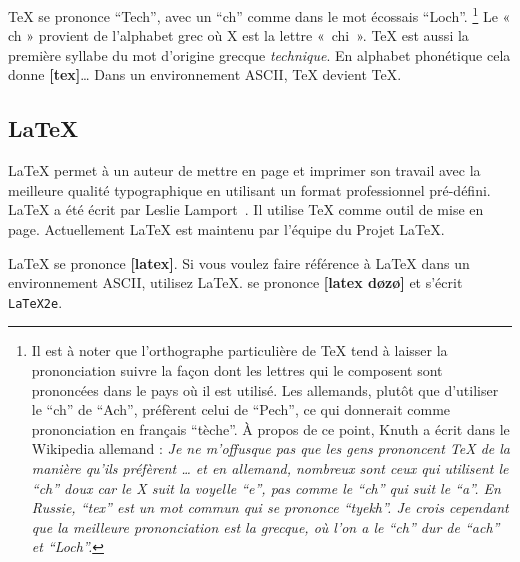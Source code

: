 \TeX{} se prononce \enquote{Tech}, avec un \enquote{ch} comme dans le mot
écossais \enquote{Loch}.
\footnote{Il est à noter que l'orthographe particulière de \TeX{}
  tend à laisser la prononciation suivre la façon dont les lettres qui
  le composent sont prononcées dans le pays où il est utilisé. Les
  allemands, plutôt que d'utiliser le \enquote{ch} de \enquote{Ach},
  préfèrent celui de \enquote{Pech}, ce qui donnerait comme
  prononciation en français \enquote{tèche}. À propos de ce point,
  Knuth a écrit dans le Wikipedia allemand : \emph{Je ne m'offusque
    pas que les gens prononcent \TeX{} de la manière qu'ils préfèrent
    \ldots{} et en allemand, nombreux sont ceux qui utilisent le
    \enquote{ch} doux car le X suit la voyelle \enquote{e}, pas comme le
    \enquote{ch} qui suit le \enquote{a}. En Russie, \enquote{tex} est
    un mot commun qui se prononce \enquote{tyekh}. Je crois cependant
    que la meilleure prononciation est la grecque, où l'on a le \enquote{ch}
    dur de \enquote{ach} et \enquote{Loch}.}}
Le « ch » provient de l'alphabet grec où X est la lettre « chi ». \TeX{} est aussi la
première syllabe du mot d'origine grecque \emph{technique}.
En alphabet phonétique cela donne
\textbf{[tex]}\dots{} Dans un environnement ASCII, \TeX{}
devient TeX.

\subsection{\LaTeX}

\LaTeX{} permet à un auteur de mettre en page et imprimer son travail
avec la meilleure qualité typographique en utilisant un format
professionnel pré-défini. \LaTeX{} a été écrit par Leslie Lamport~\cite{manual}. Il utilise \TeX{} comme outil
de mise en page. Actuellement \LaTeX{} est maintenu par
l'équipe du Projet \LaTeX{}.


\LaTeX{} se prononce \textbf{[latex]}. Si vous
voulez faire référence à \LaTeX{} dans un environnement
ASCII, utilisez LaTeX. \LaTeXe{} se prononce
\textbf{[latex d\o{}z\o{}]} et s'écrit
\texttt{LaTeX2e}.

